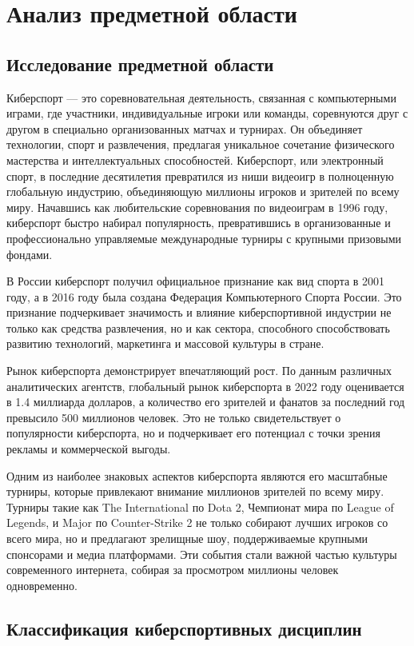 \newsection
\section{Анализ предметной области}
\subsection{Исследование предметной области}

Киберспорт — это соревновательная деятельность, связанная с компьютерными играми, где участники, индивидуальные игроки или команды, соревнуются друг с другом в специально организованных матчах и турнирах. Он объединяет технологии, спорт и развлечения, предлагая уникальное сочетание физического мастерства и интеллектуальных способностей. Киберспорт, или электронный спорт, в последние десятилетия превратился из ниши видеоигр в полноценную глобальную индустрию, объединяющую миллионы игроков и зрителей по всему миру. Начавшись как любительские соревнования по видеоиграм в 1996 году, киберспорт быстро набирал популярность, превратившись в организованные и профессионально управляемые международные турниры с крупными призовыми фондами.

В России киберспорт получил официальное признание как вид спорта в 2001 году, а в 2016 году была создана Федерация Компьютерного Спорта России. Это признание подчеркивает значимость и влияние киберспортивной индустрии не только как средства развлечения, но и как сектора, способного способствовать развитию технологий, маркетинга и массовой культуры в стране.

Рынок киберспорта демонстрирует впечатляющий рост. По данным различных аналитических агентств, глобальный рынок киберспорта в 2022 году оценивается в 1.4 миллиарда долларов, а количество его зрителей и фанатов за последний год превысило 500 миллионов человек. Это не только свидетельствует о популярности киберспорта, но и подчеркивает его потенциал с точки зрения рекламы и коммерческой выгоды.

Одним из наиболее знаковых аспектов киберспорта являются его масштабные турниры, которые привлекают внимание миллионов зрителей по всему миру. Турниры такие как The International по Dota 2, Чемпионат мира по League of Legends, и Major по Counter-Strike 2 не только собирают лучших игроков со всего мира, но и предлагают зрелищные шоу, поддерживаемые крупными спонсорами и медиа платформами. Эти события стали важной частью культуры современного интернета, собирая за просмотром миллионы человек одновременно.
\subsection{Классификация киберспортивных дисциплин}

